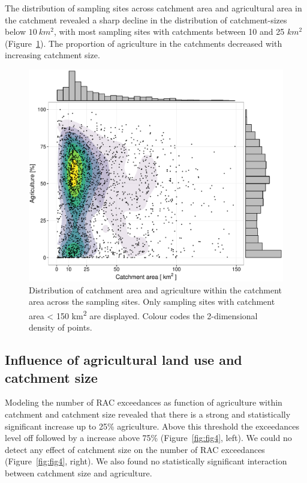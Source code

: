 \documentclass[journal=esthag,manuscript=article]{achemso}
\begin{document}
The distribution of sampling sites across catchment area and agricultural area in the catchment revealed a sharp decline in the distribution of catchment-sizes below $10~km^2$, with most sampling sites with catchments between 10 and 25 $km^2$ (Figure~\ref{fig:fig3}).
The proportion of agriculture in the catchments decreased with increasing catchment size.

\begin{figure}[ht]
  \includegraphics[width=.8\textwidth]{figure3.pdf}
  \caption{Distribution of catchment area and agriculture within the catchment area across the sampling sites.
  Only sampling sites with catchment area < 150 km\textsuperscript{2} are displayed. 
  Colour codes the 2-dimensional density of points.}
  \label{fig:fig3}
\end{figure}


\subsection{Influence of agricultural land use and catchment size}
Modeling the number of RAC exceedances as function of agriculture within catchment and catchment size revealed that there is a strong and statistically significant increase up to 25\% agriculture.
Above this threshold the exceedances level off followed by a increase above 75\% (Figure~\ref{fig:fig4}, left).
We could no detect any effect of catchment size on the number of RAC exceedances (Figure~\ref{fig:fig4}, right).
We also found no statistically significant interaction between catchment size and agriculture.
\end{document}
